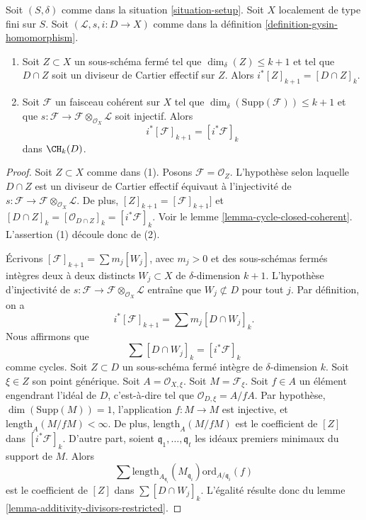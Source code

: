 \begin{lemma}
\label{lemma-easy-gysin}
Soit $(S, \delta)$ comme dans la situation \ref{situation-setup}.
Soit $X$ localement de type fini sur $S$.
Soit $(\mathcal{L}, s, i : D \to X)$ comme dans la
définition \ref{definition-gysin-homomorphism}.
\begin{enumerate}
\item Soit $Z \subset X$ un sous-schéma fermé tel
que $\dim_\delta(Z) \leq k + 1$ et tel que
$D \cap Z$ soit un diviseur de Cartier effectif sur $Z$. Alors
$i^*[Z]_{k + 1} = [D \cap Z]_k$.
\item Soit $\mathcal{F}$ un faisceau cohérent sur $X$
tel que $\dim_\delta(\text{Supp}(\mathcal{F})) \leq k + 1$ et que
$s : \mathcal{F} \to \mathcal{F} \otimes_{\mathcal{O}_X} \mathcal{L}$
soit injectif. Alors
$$
i^*[\mathcal{F}]_{k + 1} = [i^*\mathcal{F}]_k
$$
dans $\CH_k(D)$.
\end{enumerate}
\end{lemma}

\begin{proof}
Soit $Z \subset X$ comme dans (1). Posons $\mathcal{F} = \mathcal{O}_Z$.
L'hypothèse selon laquelle $D \cap Z$ est un diviseur de Cartier effectif
équivaut à l'injectivité de
$s : \mathcal{F} \to \mathcal{F} \otimes_{\mathcal{O}_X} \mathcal{L}$.
De plus, $[Z]_{k + 1} = [\mathcal{F}]_{k + 1}]$
et $[D \cap Z]_k = [\mathcal{O}_{D \cap Z}]_k = [i^*\mathcal{F}]_k$.
Voir le lemme \ref{lemma-cycle-closed-coherent}.
L'assertion (1) découle donc de (2).

\medskip\noindent
Écrivons $[\mathcal{F}]_{k + 1} = \sum m_j[W_j]$, avec $m_j > 0$
et des sous-schémas fermés intègres deux à deux distincts $W_j \subset X$
de $\delta$-dimension $k + 1$. L'hypothèse d'injectivité de
$s : \mathcal{F} \to \mathcal{F} \otimes_{\mathcal{O}_X} \mathcal{L}$
entraîne que $W_j \not \subset D$ pour tout $j$.
Par définition, on a
$$
i^*[\mathcal{F}]_{k + 1} = \sum m_j [D \cap W_j]_k.
$$
Nous affirmons que
$$
\sum [D \cap W_j]_k = [i^*\mathcal{F}]_k
$$
comme cycles.
Soit $Z \subset D$ un sous-schéma fermé intègre de $\delta$-dimension
$k$. Soit $\xi \in Z$ son point générique. Soit $A = \mathcal{O}_{X, \xi}$.
Soit $M = \mathcal{F}_\xi$. Soit $f \in A$ un élément engendrant
l'idéal de $D$, c'est-à-dire tel que $\mathcal{O}_{D, \xi} = A/fA$.
Par hypothèse, $\dim(\text{Supp}(M)) = 1$,
l'application $f : M \to M$ est injective, et
$\text{length}_A(M/fM) < \infty$. De plus, $\text{length}_A(M/fM)$
est le coefficient de $[Z]$ dans $[i^*\mathcal{F}]_k$. D'autre
part, soient $\mathfrak q_1, \ldots, \mathfrak q_t$ les idéaux premiers minimaux
du support de $M$. Alors
$$
\sum
\text{length}_{A_{\mathfrak q_i}}(M_{\mathfrak q_i})
\text{ord}_{A/\mathfrak q_i}(f)
$$
est le coefficient de $[Z]$ dans $\sum [D \cap W_j]_k$.
L'égalité résulte donc du
lemme \ref{lemma-additivity-divisors-restricted}.
\end{proof}

